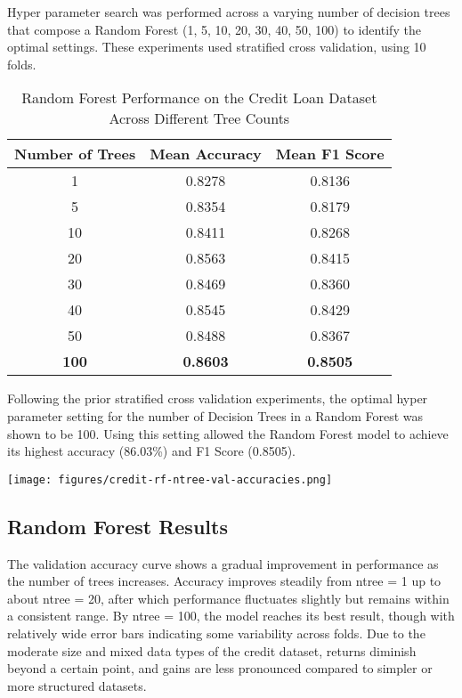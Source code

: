 \documentclass[letterpaper]{article}
\begin{document}
 Hyper parameter search was performed across a varying number of decision trees that compose a Random Forest (1, 5, 10, 20, 30, 40, 50, 100) to identify the optimal settings. These experiments used stratified cross validation, using 10 folds.

 \begin{table}[h]
\centering
\begin{tabular}{|c|c|c|}
\hline
\textbf{Number of Trees} & \textbf{Mean Accuracy} & \textbf{Mean F1 Score} \\
\hline
1    & 0.8278 & 0.8136 \\
5    & 0.8354 & 0.8179 \\
10   & 0.8411 & 0.8268 \\
20   & 0.8563 & 0.8415 \\
30   & 0.8469 & 0.8360 \\
40   & 0.8545 & 0.8429 \\
50   & 0.8488 & 0.8367 \\
\textbf{100}  & \textbf{0.8603} & \textbf{0.8505} \\
\hline
\end{tabular}
\caption{Random Forest Performance on the Credit Loan Dataset Across Different Tree Counts}
\label{tab:rf_creditloan_results}
\end{table}

Following the prior stratified cross validation experiments, the optimal hyper parameter setting for the number of Decision Trees in a Random Forest was shown to be 100. Using this setting allowed the Random Forest model to achieve its highest accuracy (86.03\%) and F1 Score (0.8505).


\vspace{0.2in}
\begin{minipage}{\linewidth}
    \centering
    \texttt{[image: figures/credit-rf-ntree-val-accuracies.png]}
\end{minipage}
\vspace{0.1in}

\subsection*{Random Forest Results}

The validation accuracy curve shows a gradual improvement in performance as the number of trees increases. Accuracy improves steadily from ntree = 1 up to about ntree = 20, after which performance fluctuates slightly but remains within a consistent range. By ntree = 100, the model reaches its best result, though with relatively wide error bars indicating some variability across folds. Due to the moderate size and mixed data types of the credit dataset, returns diminish beyond a certain point, and gains are less pronounced compared to simpler or more structured datasets.
\end{document}
